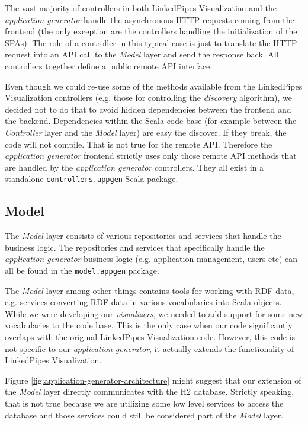 The vast majority of controllers in both LinkedPipes Visualization and the \emph{application generator} handle the asynchronous HTTP requests coming from the frontend (the only exception are the controllers handling the initialization of the SPAs). The role of a controller in this typical case is just to translate the HTTP request into an API call to the \emph{Model} layer and send the response back. All controllers together define a public remote API interface.

Even though we could re-use some of the methods available from the LinkedPipes Visualization controllers (e.g. those for controlling the \emph{discovery} algorithm), we decided not to do that to avoid hidden dependencies between the frontend and the backend. Dependencies within the Scala code base (for example between the \emph{Controller} layer and the \emph{Model} layer) are easy the discover. If they break, the code will not compile. That is not true for the remote API. Therefore the \emph{application generator} frontend strictly uses only those remote API methods that are handled by the \emph{application generator} controllers. They all exist in a standalone \texttt{controllers.appgen} Scala package.

\subsection{Model}

The \emph{Model} layer consists of various repositories and services that handle the business logic. The repositories and services that specifically handle the \emph{application generator} business logic (e.g. application management, users etc) can all be found in the \texttt{model.appgen} package.

The \emph{Model} layer among other things contains tools for working with RDF data, e.g. services converting RDF data in various vocabularies into Scala objects. While we were developing our \emph{visualizers}, we needed to add support for some new vocabularies to the code base. This is the only case when our code significantly overlaps with the original LinkedPipes Visualization code. However, this code is not specific to our \emph{application generator}, it actually extends the functionality of LinkedPipes Visualization.

Figure \ref{fig:application-generator-architecture} might suggest that our extension of the \emph{Model} layer directly communicates with the H2 database. Strictly speaking, that is not true because we are utilizing some low level services to access the database and those services could still be considered part of the \emph{Model} layer.


